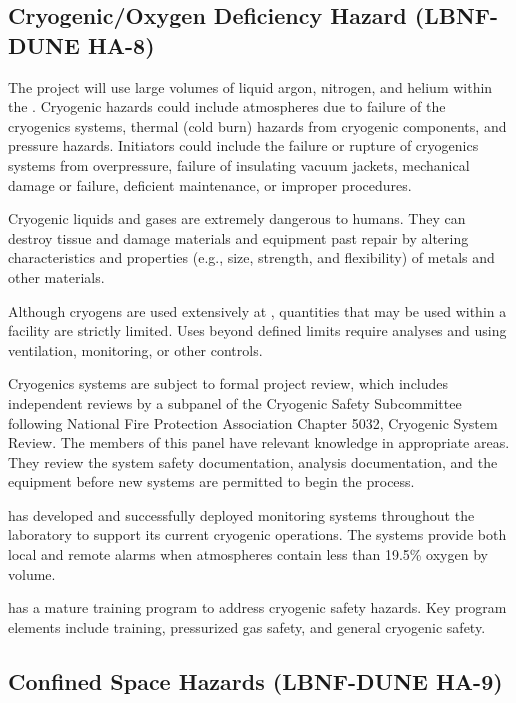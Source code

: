 \subsection{Cryogenic/Oxygen Deficiency Hazard (LBNF-DUNE HA-8)}

The  project will use large volumes of liquid
argon, nitrogen, and helium within the . Cryogenic
hazards could include  atmospheres due to failure of
the cryogenics systems, thermal (cold burn) hazards from cryogenic
components, and pressure hazards. Initiators could include the failure
or rupture of cryogenics systems from overpressure, failure of
insulating vacuum jackets, mechanical damage or failure, deficient
maintenance, or improper procedures.

Cryogenic liquids and gases are extremely dangerous to humans.
They can destroy tissue and damage materials and equipment past repair
by altering characteristics and properties (e.g., size, strength, and
flexibility) of metals and other materials.

Although cryogens are used extensively at \fnal, quantities that may
be used within a facility are strictly limited. Uses beyond defined
limits require  analyses and using
ventilation,  monitoring, or other controls.

Cryogenics systems are subject to formal project review, which includes
independent reviews by a subpanel of the Cryogenic Safety Subcommittee
following National Fire Protection Association Chapter 5032, Cryogenic
System Review. The members of this panel have relevant knowledge in
appropriate areas. They review the system safety documentation,
 analysis documentation, and the equipment before new
systems are permitted to begin the \cooldown process.

\fnal has developed and successfully deployed  monitoring
systems throughout the laboratory to support its current cryogenic
operations. The systems provide both local and remote alarms when
atmospheres contain less than 19.5\% oxygen by volume.

\fnal has a mature training program to address cryogenic safety
hazards. Key program elements include  training,
pressurized gas safety, and general cryogenic safety.


\subsection{Confined Space Hazards (LBNF-DUNE HA-9)}

